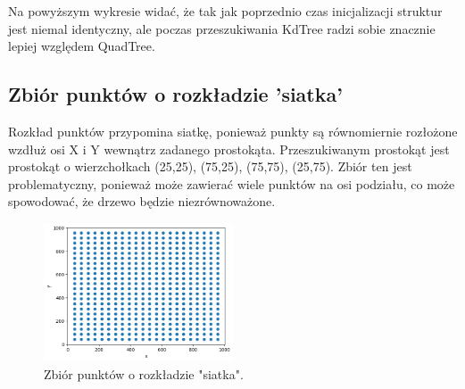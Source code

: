 \documentclass{lab}
\begin{document}
Na powyższym wykresie widać, że tak jak poprzednio czas inicjalizacji struktur jest niemal identyczny, ale poczas przeszukiwania KdTree radzi sobie znacznie lepiej względem QuadTree.

\newpage
\subsection{Zbiór punktów o rozkładzie 'siatka'}
Rozkład punktów przypomina siatkę, ponieważ punkty są równomiernie rozłożone wzdłuż osi X i Y wewnątrz zadanego prostokąta.
Przeszukiwanym prostokąt jest prostokąt o wierzchołkach (25,25), (75,25), (75,75), (25,75).
Zbiór ten jest problematyczny, ponieważ może zawierać wiele punktów na osi podziału, co może spowodować, że drzewo będzie niezrównoważone.

\begin{figure}[H]
  \centering
  \includegraphics[width=0.5\textwidth]{resources/grid.png}
  \caption{Zbiór punktów o rozkładzie "siatka".}
  \label{fig:grid}
\end{figure}
\end{document}
